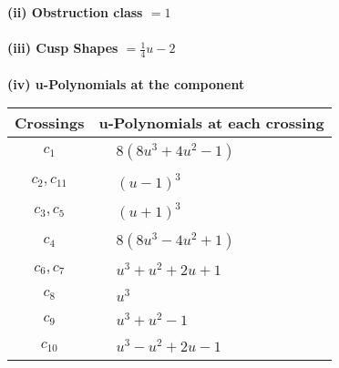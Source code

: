 \documentclass[1p]{elsarticle_modified}
\theoremstyle{definition}
\begin{document}
\flushleft \textbf{(ii) Obstruction class $= 1$}\\~\\
\flushleft \textbf{(iii) Cusp Shapes $= \frac{1}{4} u-2$}\\~\\
\newpage\renewcommand{\arraystretch}{1}
\flushleft \textbf{(iv) u-Polynomials at the component}\newline \\
\begin{tabular}{m{50pt}|m{274pt}}
Crossings & \hspace{64pt}u-Polynomials at each crossing \\
\hline $$\begin{aligned}c_{1}\end{aligned}$$&$\begin{aligned}
&8(8 u^3+4 u^2-1)
\end{aligned}$\\
\hline $$\begin{aligned}c_{2},c_{11}\end{aligned}$$&$\begin{aligned}
&(u-1)^3
\end{aligned}$\\
\hline $$\begin{aligned}c_{3},c_{5}\end{aligned}$$&$\begin{aligned}
&(u+1)^3
\end{aligned}$\\
\hline $$\begin{aligned}c_{4}\end{aligned}$$&$\begin{aligned}
&8(8 u^3-4 u^2+1)
\end{aligned}$\\
\hline $$\begin{aligned}c_{6},c_{7}\end{aligned}$$&$\begin{aligned}
&u^3+u^2+2 u+1
\end{aligned}$\\
\hline $$\begin{aligned}c_{8}\end{aligned}$$&$\begin{aligned}
&u^3
\end{aligned}$\\
\hline $$\begin{aligned}c_{9}\end{aligned}$$&$\begin{aligned}
&u^3+u^2-1
\end{aligned}$\\
\hline $$\begin{aligned}c_{10}\end{aligned}$$&$\begin{aligned}
&u^3- u^2+2 u-1
\end{aligned}$\\
\hline
\end{tabular}\\~\\
\end{document}
